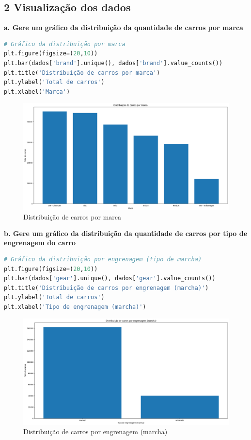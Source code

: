 \subsection*{\textbf{2 Visualização dos dados}}
\begin{adjustwidth}{1em}{}
\textbf{a. Gere um gráfico da distribuição da quantidade de carros por marca}
\end{adjustwidth}
\begin{lstlisting}[language=Python, style=input]
# Gráfico da distribuição por marca
plt.figure(figsize=(20,10)) 
plt.bar(dados['brand'].unique(), dados['brand'].value_counts()) 
plt.title('Distribuição de carros por marca') 
plt.ylabel('Total de carros') 
plt.xlabel('Marca') 
\end{lstlisting}
\begin{figure}[H]
\centering
\includegraphics[width=1\linewidth]{apendices/fig/2_IAA002_1.png}
\caption{Distribuição de carros por marca}
\end{figure}

\begin{adjustwidth}{1em}{}
\textbf{b. Gere um gráfico da distribuição da quantidade de carros por tipo de engrenagem do carro}
\end{adjustwidth}
\begin{lstlisting}[language=Python, style=input]
# Gráfico da distribuição por engrenagem (tipo de marcha)
plt.figure(figsize=(20,10)) 
plt.bar(dados['gear'].unique(), dados['gear'].value_counts()) 
plt.title('Distribuição de carros por engrenagem (marcha)') 
plt.ylabel('Total de carros') 
plt.xlabel('Tipo de engrenagem (marcha)') 
\end{lstlisting}
\begin{figure}[H]
\centering
\includegraphics[width=1\linewidth]{apendices/fig/2_IAA002_2.png}
\caption{Distribuição de carros por engrenagem (marcha)}
\end{figure}

